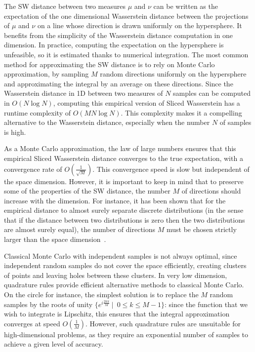 The SW distance between two measures $\mu$ and $\nu$ can be written as the expectation of the one dimensional Wasserstein distance between the projections of $\mu$ and $\nu$ on a line whose direction is drawn uniformly on the hypersphere. It benefits from the simplicity of the Wasserstein distance computation in one dimension. In practice, computing the expectation on the hypersphere is unfeasible, so it is estimated thanks to numerical integration. The most common method for approximating the SW distance is to rely on Monte Carlo approximation, by sampling $M$ random directions uniformly on the hypersphere and approximating the integral by an average on these directions. Since the Wasserstein distance in 1D between two measures of $N$ samples can be computed in \(O(N \log N)\), computing this empirical version of Sliced Wasserstein has a runtime complexity of \(O(M N \log N)\). This complexity makes it a compelling alternative to the Wasserstein distance, especially when the number $N$ of samples is high.


As a Monte Carlo approximation, the law of large numbers ensures that this 
empirical Sliced Wasserstein distance converges to the true expectation, with a 
convergence rate of \(O(\frac{1} {\sqrt{M}})\). This convergence speed is slow 
but independent of the space dimension. However,  it is important to keep in 
mind that to preserve some of the properties of the 
{SW}
distance, the number $M$ of directions should increase 
with the dimension. For instance,  it has been shown that for the empirical 
distance to almost surely separate discrete distributions (in the sense that if 
the distance between two distributions is zero then the two distributions are 
almost surely equal), the number of directions $M$ must be chosen strictly 
larger than the space dimension~\citep{tanguy2023reconstructing}. 

Classical Monte Carlo with independent samples is not always optimal, since 
independent random samples do not cover the space efficiently, creating clusters 
of points and leaving holes between these clusters. In very low dimension, 
quadrature rules provide efficient alternative methods to classical Monte Carlo. 
On the circle for instance, the simplest solution is to replace the $M$ random 
samples by the roots of unity $\{e^{i \frac{2k\pi}{M}}\ |\ \;0\le k \le M-1\}$: 
 since the function that we wish to integrate is Lipschitz, this 
ensures that 
{the}
integral approximation converges at speed $O(\frac 1 M)$. However, such 
quadrature rules are unsuitable for high-dimensional problems, as they require 
an exponential number of samples to achieve a given level of accuracy. 

